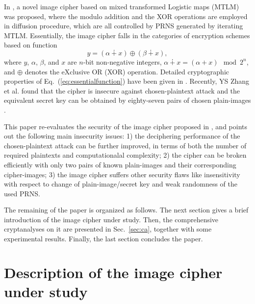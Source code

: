 \documentclass{ws-ijbc}
\begin{document}
In \cite{Sam:TLM:MTA2012}, a novel image cipher based on
mixed transformed Logistic maps (MTLM) was proposed, where
the modulo addition and the XOR operations
are employed in diffusion procedure, which are all controlled by
PRNS generated by iterating MTLM. Essentially, the image cipher falls in the categories of encryption schemes based on function
\begin{equation}
\label{eq:essentialfunction}
y = (\alpha \dotplus x)\oplus (\beta \dotplus x),
\end{equation}
where $y$, $\alpha$, $\beta$, and $x$ are $n$-bit non-negative integers,
$\alpha \dotplus x = (\alpha + x) \mod 2^{n}$, and $\oplus$ denotes
the eXclusive OR (XOR) operation. Detailed cryptographic properties of Eq.~(\ref{eq:essentialfunction}) have been given in \cite{Cqli:breakmodulo:IJBC13}.
Recently, YS Zhang et al. found that the cipher is insecure against
chosen-plaintext attack and the equivalent secret key
can be obtained by eighty-seven pairs of
chosen plain-images \cite{Zhang:Cryptanalyzing:MTA2014}.

This paper re-evaluates the security of the image cipher proposed
in \cite{Sam:TLM:MTA2012}, and points out the following main insecurity issues:
1) the deciphering performance
of the chosen-plaintext attack can be further
improved, in terms of both the number of required plaintexts and computationalal complexity;
2) the cipher can be broken efficiently with only two pairs of
known plain-images and their corresponding cipher-images;  3) the image cipher suffers other security flaws like insensitivity with respect to change of plain-image/secret key and weak randomness of the used PRNS.

The remaining of the paper is organized as follows. The next section gives a brief introduction of the image
cipher under study. Then, the comprehensive cryptanalyses on it are presented in Sec.~\ref{sec:ca},
together with some experimental results. Finally, the last section concludes the paper.

\section{Description of the image cipher under study}
\label{sec:alogrithm}
\end{document}
